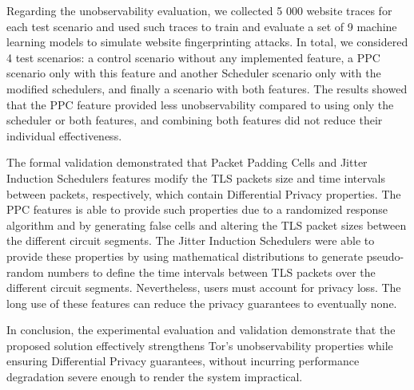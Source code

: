 Regarding the unobservability evaluation, we collected 5 000 website traces for each test scenario and used such traces to train and evaluate a set of 9 machine learning models to simulate website fingerprinting attacks. In total, we considered 4 test scenarios: a control scenario without any implemented feature, a PPC scenario only with this feature and another Scheduler scenario only with the modified schedulers, and finally a scenario with both features. The results showed that the PPC feature provided less unobservability compared to using only the scheduler or both features, and combining both features did not reduce their individual effectiveness.

The formal validation demonstrated that Packet Padding Cells and Jitter Induction Schedulers features modify the TLS packets size and time intervals between packets, respectively, which contain Differential Privacy properties. The PPC features is able to provide such properties due to a randomized response algorithm and by generating false cells and altering the TLS packet sizes between the different circuit segments. The Jitter Induction Schedulers were able to provide these properties by using mathematical distributions to generate pseudo-random numbers to define the time intervals between TLS packets over the different circuit segments. Nevertheless, users must account for privacy loss. The long use of these features can reduce the privacy guarantees to eventually none.

In conclusion, the experimental evaluation and validation demonstrate that the proposed solution effectively strengthens Tor's unobservability properties while ensuring Differential Privacy guarantees, without incurring performance degradation severe enough to render the system impractical.

